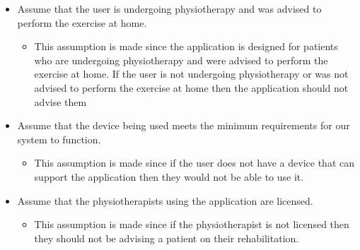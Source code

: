 \documentclass{article}
\begin{document}
\begin{itemize}
\begin{itemize}
    \end{itemize}
    \item Assume that the user is undergoing physiotherapy and was advised to perform the exercise at home.
    \begin{itemize}
        \item This assumption is made since the application is designed for patients who are undergoing physiotherapy and were advised to perform the exercise at home. If the user is not undergoing physiotherapy or was not advised to perform the exercise at home then the application should not advise them
    \end{itemize}
    \item Assume that the device being used meets the minimum requirements for our system to function.
    \begin{itemize}
        \item This assumption is made since if the user does not have a device that can support the application then they would not be able to use it.
    \end{itemize}
    \item Assume that the physiotherapists using the application are licensed.
    \begin{itemize}
        \item This assumption is made since if the physiotherapist is not licensed then they should not be advising a patient on their rehabilitation.
    \end{itemize}
\end{itemize}
\end{document}
